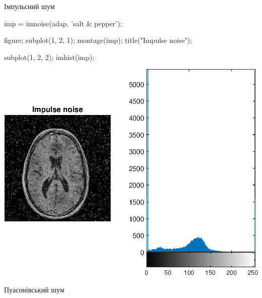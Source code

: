 \documentclass[12pt]{article}
\begin{document}
\begin{par}
\begin{flushleft}
Імпульсний шум
\end{flushleft}
\end{par}

\begin{matlabcode}
imp = imnoise(adap, 'salt & pepper');

figure;
subplot(1, 2, 1);
montage(imp);
title("Impulse noise");

subplot(1, 2, 2);
imhist(imp);
\end{matlabcode}
\begin{center}
\includegraphics[width=\maxwidth{56.196688409433015em}]{figure_4}
\end{center}

\begin{par}
\begin{flushleft}
Пуасонівський шум
\end{flushleft}
\end{par}
\end{document}
